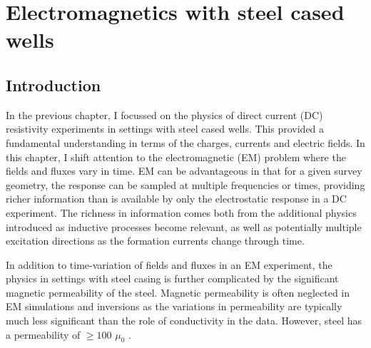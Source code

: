 
\chapter{Electromagnetics with steel cased wells}
\label{ch:casing-em}

\section{Introduction}
In the previous chapter, I focussed on the physics of direct current (DC) resistivity experiments in settings with steel cased wells. This provided a fundamental understanding in terms of the charges, currents and electric fields. In this chapter, I shift attention to the electromagnetic (EM) problem where the fields and fluxes vary in time. EM can be advantageous in that for a given survey geometry, the response can be sampled at multiple frequencies or times, providing richer information than is available by only the electrostatic response in a DC experiment. The richness in information comes both from the additional physics introduced as inductive processes become relevant, as well as potentially multiple excitation directions as the formation currents change through time.

In addition to time-variation of fields and fluxes in an EM experiment, the physics in settings with steel casing is further complicated by the significant magnetic permeability of the steel. Magnetic permeability is often neglected in EM simulations and inversions as the variations in permeability are typically much less significant than the role of conductivity in the data. However, steel has a permeability of $\geq 100$ $\mu_0$ \citep{wuhabashy1994}.

